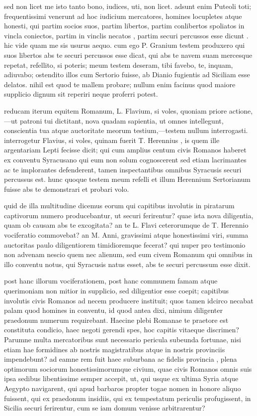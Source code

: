  sed non licet me isto tanto bono, iudices, uti, non licet. adsunt enim Puteoli toti; frequentissimi venerunt ad hoc iudicium mercatores, homines locupletes atque honesti, qui partim socios suos, partim libertos, partim conlibertos spoliatos in vincla coniectos, partim in vinclis necatos , partim securi percussos esse dicunt . hic vide quam me sis usurus aequo. cum ego P. Granium testem produxero qui suos libertos abs te securi percussos esse dicat, qui abs te navem suam mercesque repetat, refellito, si poteris; meum testem deseram, tibi favebo, te, inquam, adiuvabo; ostendito illos cum Sertorio fuisse, ab Dianio fugientis ad Siciliam esse delatos. nihil est quod te mallem probare; nullum enim facinus quod maiore supplicio dignum sit reperiri neque proferri potest.

 reducam iterum equitem Romanum, L. Flavium, si voles, quoniam priore actione,—ut patroni tui dictitant, nova quadam sapientia, ut omnes intellegunt, conscientia tua atque auctoritate meorum testium,—testem nullum interrogasti. interrogetur Flavius, si voles, quinam fuerit T. Herennius , is quem ille argentariam Lepti fecisse dicit; qui cum amplius centum civis Romanos haberet ex conventu Syracusano qui eum non solum cognoscerent sed etiam lacrimantes ac te implorantes defenderent, tamen inspectantibus omnibus Syracusis securi percussus est. hunc quoque testem meum refelli et illum Herennium Sertorianum fuisse abs te demonstrari et probari volo.

 quid de illa multitudine dicemus eorum qui capitibus involutis in piratarum captivorum numero producebantur, ut securi ferirentur? quae ista nova diligentia, quam ob causam abs te excogitata? an te L. Flavi ceterorumque de T. Herennio vociferatio commovebat? an M. Anni, gravissimi atque honestissimi viri, summa auctoritas paulo diligentiorem timidioremque fecerat? qui nuper pro testimonio non advenam nescio quem nec alienum, sed eum civem Romanum qui omnibus in illo conventu notus, qui Syracusis natus esset, abs te securi percussum esse dixit.

 post hanc illorum vociferationem, post hanc communem famam atque querimoniam non mitior in supplicio, sed diligentior esse coepit; capitibus involutis civis Romanos ad necem producere instituit; quos tamen idcirco necabat palam quod homines in conventu, id quod antea dixi, nimium diligenter praedonum numerum requirebant. Haecine plebi Romanae te praetore est constituta condicio, haec negoti gerendi spes, hoc capitis vitaeque discrimen? Parumne multa mercatoribus sunt necessario pericula subeunda fortunae, nisi etiam hae formidines ab nostris magistratibus atque in nostris provinciis impendebunt? ad eamne rem fuit haec suburbana ac fidelis provincia , plena optimorum sociorum honestissimorumque civium, quae civis Romanos omnis suis ipsa sedibus libentissime semper accepit, ut, qui usque ex ultima Syria atque Aegypto navigarent, qui apud barbaros propter togae nomen in honore aliquo fuissent, qui ex praedonum insidiis, qui ex tempestatum periculis profugissent, in Sicilia securi ferirentur, cum se iam domum venisse arbitrarentur?

